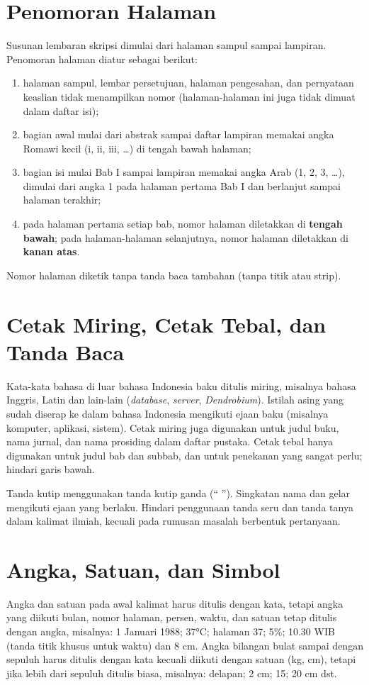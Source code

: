 \section{Penomoran Halaman}
Susunan lembaran skripsi dimulai dari halaman sampul sampai lampiran. Penomoran halaman diatur sebagai berikut:
\begin{enumerate}
\item halaman sampul, lembar persetujuan, halaman pengesahan, dan pernyataan keaslian tidak menampilkan nomor (halaman-halaman ini juga tidak dimuat dalam daftar isi);
\item bagian awal mulai dari abstrak sampai daftar lampiran memakai angka Romawi kecil (i, ii, iii, \ldots) di tengah bawah halaman;
\item bagian isi mulai Bab I sampai lampiran memakai angka Arab (1, 2, 3, \ldots), dimulai dari angka 1 pada halaman pertama Bab I dan berlanjut sampai halaman terakhir;
\item pada halaman pertama setiap bab, nomor halaman diletakkan di \textbf{tengah bawah}; pada halaman-halaman selanjutnya, nomor halaman diletakkan di \textbf{kanan atas}.
\end{enumerate}
Nomor halaman diketik tanpa tanda baca tambahan (tanpa titik atau strip).

\section{Cetak Miring, Cetak Tebal, dan Tanda Baca}
Kata-kata bahasa di luar bahasa Indonesia baku ditulis miring, misalnya bahasa Inggris, Latin dan lain-lain (\textit{database}, \textit{server}, \textit{Dendrobium}). Istilah asing yang sudah diserap ke dalam bahasa Indonesia mengikuti ejaan baku (misalnya komputer, aplikasi, sistem). Cetak miring juga digunakan untuk judul buku, nama jurnal, dan nama prosiding dalam daftar pustaka. Cetak tebal hanya digunakan untuk judul bab dan subbab, dan untuk penekanan yang sangat perlu; hindari garis bawah.

Tanda kutip menggunakan tanda kutip ganda (“ ”). Singkatan nama dan gelar mengikuti ejaan yang berlaku. Hindari penggunaan tanda seru dan tanda tanya dalam kalimat ilmiah, kecuali pada rumusan masalah berbentuk pertanyaan.

\section{Angka, Satuan, dan Simbol}
Angka dan satuan pada awal kalimat harus ditulis dengan kata, tetapi angka yang diikuti bulan, nomor halaman, persen, waktu, dan satuan tetap ditulis dengan angka, misalnya: 1 Januari 1988; 37°C; halaman 37; 5\%; 10.30 WIB (tanda titik khusus untuk waktu) dan 8 cm. Angka bilangan bulat sampai dengan sepuluh harus ditulis dengan kata kecuali diikuti dengan satuan (kg, cm), tetapi jika lebih dari sepuluh ditulis biasa, misalnya: delapan; 2 cm; 15; 20 cm dst.

